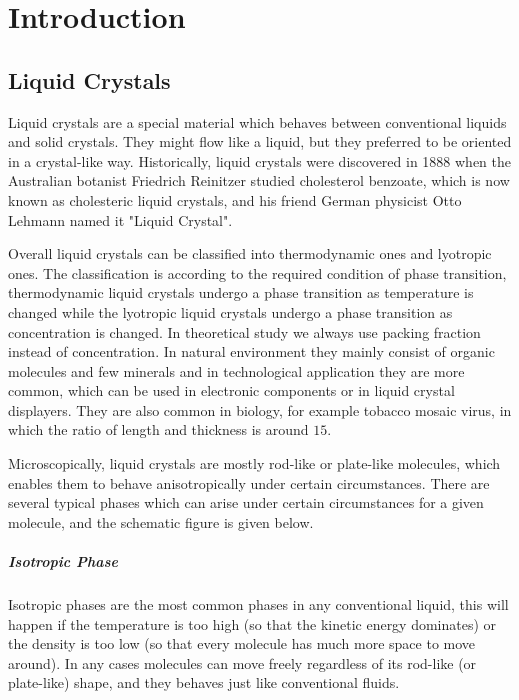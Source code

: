 
\chapter{Introduction}

\section{Liquid Crystals}
Liquid crystals are a special material which behaves between conventional liquids and solid crystals. They might flow like a liquid, but they preferred to be oriented in a crystal-like way. Historically, liquid crystals were discovered in 1888 when the Australian botanist Friedrich Reinitzer studied cholesterol benzoate, which is now known as cholesteric liquid crystals, and his friend German physicist Otto Lehmann named it "Liquid Crystal".

Overall liquid crystals can be classified into thermodynamic ones and lyotropic ones. The classification is according to the required condition of phase transition, thermodynamic liquid crystals undergo a phase transition as temperature is changed while the lyotropic liquid crystals undergo a phase transition as concentration is changed. In theoretical study we always use packing fraction instead of concentration. In natural environment they mainly consist of organic molecules and few minerals and in technological application they are more common, which can be used in electronic components or in liquid crystal displayers. They are also common in biology, for example tobacco mosaic virus, in which the ratio of length and thickness is around $15$.

Microscopically, liquid crystals are mostly rod-like or plate-like molecules, which enables them to behave anisotropically under certain circumstances. There are several typical phases which can arise under certain circumstances for a given molecule, and the schematic figure is given below.

\paragraph{Isotropic Phase}
Isotropic phases are the most common phases in any conventional liquid, this will happen if the temperature is too high (so that the kinetic energy dominates) or the density is too low (so that every molecule has much more space to move around). In any cases molecules can move freely regardless of its rod-like (or plate-like) shape, and they behaves just like conventional fluids.

